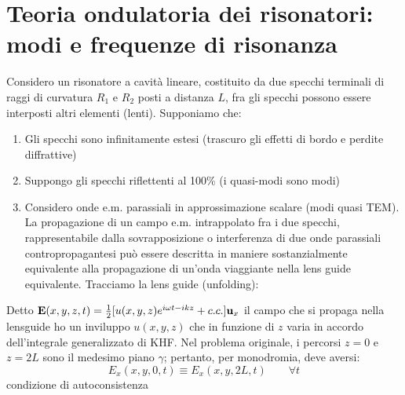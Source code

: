 \section{Teoria ondulatoria dei risonatori:  modi e frequenze di risonanza}
Considero un risonatore a cavità lineare, costituito da due specchi terminali di raggi di curvatura $R_1$ e $R_2$ posti a distanza $L$, fra gli specchi possono essere interposti altri elementi (lenti). Supponiamo che:
\begin{enumerate}
\item Gli specchi sono infinitamente estesi (trascuro gli effetti di bordo e perdite diffrattive)
\item  Suppongo gli specchi riflettenti al 100\% (i quasi-modi sono modi)
\item Considero onde e.m. parassiali in approssimazione scalare (modi quasi TEM). La propagazione di un campo e.m. intrappolato fra i due specchi, rappresentabile dalla sovrapposizione o interferenza di due onde parassiali contropropagantesi può essere descritta in maniere sostanzialmente equivalente alla propagazione di un'onda viaggiante nella lens guide equivalente.
Tracciamo la lens guide (unfolding):
\end{enumerate}
Detto $\mathbf{E}(x,y,z,t) = \frac{1}{2} [u(x,y,z) e^{i\omega t-ikz} + c.c.] \mathbf{u}_x$ il campo che si propaga nella lensguide ho un inviluppo $u(x,y,z)$ che in funzione di $z$ varia in accordo dell'integrale generalizzato di KHF. Nel problema originale, i percorsi $z=0$ e $z=2L$ sono il medesimo piano $\gamma$; pertanto, per monodromia, deve aversi:
\begin{equation*}
E_x(x,y,0,t) \equiv E_x(x,y,2L,t) \qquad \forall t
\end{equation*}
condizione di autoconsistenza

